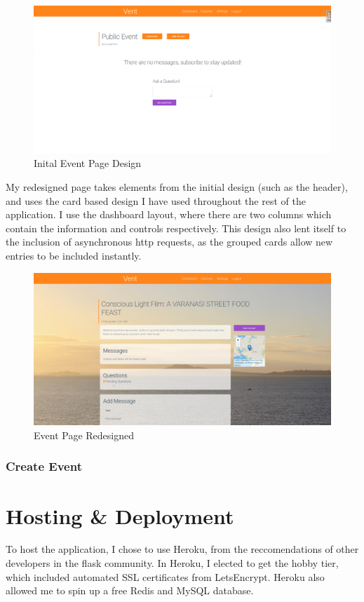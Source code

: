 \documentclass[a4paper,oneside,12pt]{report}
\begin{document}
	\begin{figure}[H]
		\caption{Inital Event Page Design}
		\includegraphics[width=\linewidth]{static/front-end6.png}
	\end{figure}
	
	My redesigned page takes elements from the initial design (such as the header), and uses the card based design I have used throughout the rest of the application. I use the dashboard layout, where there are two columns which contain the information and controls respectively. This design also lent itself to the inclusion of asynchronous http requests, as the grouped cards allow new entries to be included instantly.
	
	\begin{figure}[H]
		\caption{Event Page Redesigned}
		\includegraphics[width=\linewidth]{static/front-end7.jpg}
	\end{figure}


	\subsection{Create Event}

	\chapter{Hosting \& Deployment}
	To host the application, I chose to use Heroku, from the reccomendations of other developers in the flask community. In Heroku, I elected to get the hobby tier, which included automated SSL certificates from LetsEncrypt. Heroku also allowed me to spin up a free Redis and MySQL database.
	
\end{document}
